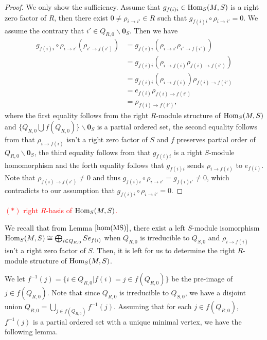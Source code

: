\documentclass[a4paper, reqno]{amsart}
\theoremstyle{definition}
\theoremstyle{remark}
\numberwithin{equation}{section}
\begin{document}
\begin{proof}
    We only show the sufficiency. Assume that $g_{f(i)i}\in \textup{Hom}_S(M,S)$ is a right zero factor of $R$, then there exist  $0 \neq \rho_{i\to i'} \in R$ such that $ g_{f(i)i}\circ \rho_{i\to i'} = 0$. We assume the contrary that $ i' \in Q_{R,0}\backslash\mathbf{0}_S$. Then we have
    \begin{align*}
        g_{f(i)i}\circ \rho_{i\to i'}( \rho_{i'\to f(i')}) 
        &= g_{f(i)i}(\rho_{i\to i'} \rho_{i'\to f(i')})\\
        &=  g_{f(i)i}(\rho_{i\to f(i)}\rho_{f(i)\to f(i')})\\
        &=  g_{f(i)i}(\rho_{i\to f(i)}) \rho_{f(i)\to f(i')}\\
        &=  e_{f(i)} \rho_{f(i)\to f(i')}\\
        &=  \rho_{f(i)\to f(i')},
    \end{align*}  
    where the first equality follows from the right $R$-module structure of $\textup{Hom}_S(M,S)$ and $\{Q_{R,0}\bigcup f(Q_{R,0})\}\backslash \mathbf{0}_S$ is a partial ordered set, the second equality follows from that $\rho_{i\to f(i)}$ isn't a right zero factor of $S$ and $f$ preserves partial order of $Q_{R,0}\backslash \mathbf{0}_S$, the third equality follows from that $g_{f(i)i}$ is a right $S$-module homomorphism and the forth equality follows that $g_{f(i)i}$ sends $\rho_{i\to f(i)}$ to $e_{f(i)}$. Note that $\rho_{f(i)\to f(i')}\neq 0$  and thus $g_{f(i)i}\circ \rho_{i\to i'} = g_{f(i)i'} \neq 0$, which contradicts to our assumption that $ g_{f(i)i}\circ \rho_{i\to i'} = 0$. 
\end{proof}

\textcolor{red}{$(*)$ right $R$-basis of $\textup{Hom}_S(M,S)$.}

We recall that from Lemma $\ref{hom(MS)}$, there exist a left $S$-module isomorphism $ \textup{Hom}_S(M,S) \cong \bigoplus_{i\in Q_{R,0}}Se_{f(i)}$ when $Q_{R,0}$ is irreducible to $Q_{S,0}$ and $\rho_{i\to f(i)}$ isn't a right zero factor of $S$. Then, it is left for us to determine the right $R$-module structure of $\textup{Hom}_S(M,S)$.

We let $f^{-1}(j) = \{ i\in Q_{R,0}|f(i) = j \in f(Q_{R,0})\} $ be the pre-image of $j\in f(Q_{R,0})$. Note that since $Q_{R,0}$ is irreducible to $Q_{S,0}$, we have a disjoint union $Q_{R,0} = \bigcup_{j\in f(Q_{R,0})} f^{-1}(j)$. Assuming that for each $j\in f(Q_{R,0})$, $f^{-1}(j)$ is a partial ordered set with a unique minimal vertex, we have the following lemma. 
\end{document}
